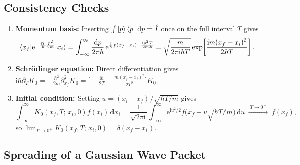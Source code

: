 \documentclass[11pt,a4paper]{article}
\newcommand{\ii}{\mathrm{i}}
\newcommand{\dd}{\mathrm{d}}
\newcommand{\ee}{\mathrm{e}}
\begin{document}
\subsection{Consistency Checks}

\begin{enumerate}[leftmargin=1.5em, itemsep=3pt]
    \item \textbf{Momentum basis:} Inserting $\int\ket{p}\bra{p}\,\dd p = \hat I$ once on the full interval $T$ gives
    \[
        \braket{x_f|\ee^{-\frac{\ii T}{\hbar}\frac{\hat p^2}{2m}}|x_i}
        = \int_{-\infty}^{\infty}\frac{\dd p}{2\pi\hbar}\,\ee^{\frac{\ii}{\hbar}p(x_f-x_i)-\frac{\ii p^2 T}{2m\hbar}}
        = \sqrt{\frac{m}{2\pi\ii\hbar T}}\exp\!\left[\frac{\ii m(x_f-x_i)^2}{2\hbar T}\right].
    \]
    \item \textbf{Schr\"odinger equation:} Direct differentiation gives $\ii\hbar\partial_T K_0 = -\frac{\hbar^2}{2m}\partial_{x_f}^2 K_0 = \bigl[-\frac{\ii\hbar}{2T} + \frac{m(x_f-x_i)^2}{2T^2}\bigr]K_0$.
    \item \textbf{Initial condition:} Setting $u = (x_i-x_f)/\sqrt{\hbar T/m}$ gives
    \[
        \int_{-\infty}^{\infty} K_0(x_f,T;\,x_i,0)f(x_i)\,\dd x_i
        = \frac{1}{\sqrt{2\pi\ii}}\int_{-\infty}^{\infty} \ee^{\ii u^2/2}f\bigl(x_f + u\sqrt{\hbar T/m}\bigr)\,\dd u
        \;\xrightarrow{\;T\to 0^+\;}\; f(x_f),
    \]
    so $\lim_{T\to 0^+}K_0(x_f,T;\,x_i,0) = \delta(x_f-x_i)$.
\end{enumerate}

\subsection{Spreading of a Gaussian Wave Packet}
\label{sec:free-packet}
\end{document}
